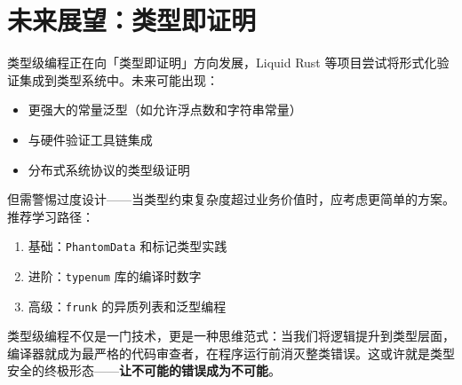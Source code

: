 \chapter{未来展望：类型即证明}
类型级编程正在向「类型即证明」方向发展，Liquid Rust 等项目尝试将形式化验证集成到类型系统中。未来可能出现：\par
\begin{itemize}
\item 更强大的常量泛型（如允许浮点数和字符串常量）
\item 与硬件验证工具链集成
\item 分布式系统协议的类型级证明
\end{itemize}
但需警惕过度设计——当类型约束复杂度超过业务价值时，应考虑更简单的方案。推荐学习路径：\par
\begin{enumerate}
\item 基础：\texttt{PhantomData} 和标记类型实践
\item 进阶：\texttt{typenum} 库的编译时数字
\item 高级：\texttt{frunk} 的异质列表和泛型编程
\end{enumerate}
类型级编程不仅是一门技术，更是一种思维范式：当我们将逻辑提升到类型层面，编译器就成为最严格的代码审查者，在程序运行前消灭整类错误。这或许就是类型安全的终极形态——\textbf{让不可能的错误成为不可能}。\par
